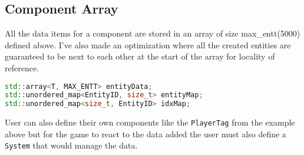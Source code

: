 \documentclass[16pt,a4paper]{article}
\begin{document}
\subsection{Component Array}
All the data items for a component are stored in an array of size max\_entt(5000) defined above. I've also made an optimization where all the created entities are guaranteed to be next to each other at the start of the array for locality of reference. 
\begin{lstlisting}[language=c++]
std::array<T, MAX_ENTT> entityData;
std::unordered_map<EntityID, size_t> entityMap;
std::unordered_map<size_t, EntityID> idxMap;
\end{lstlisting}

User can also define their own components like the  \texttt{PlayerTag} from the example above but for the game to react to the data added the user must also define a \texttt{System} that would manage the data. 
\end{document}
